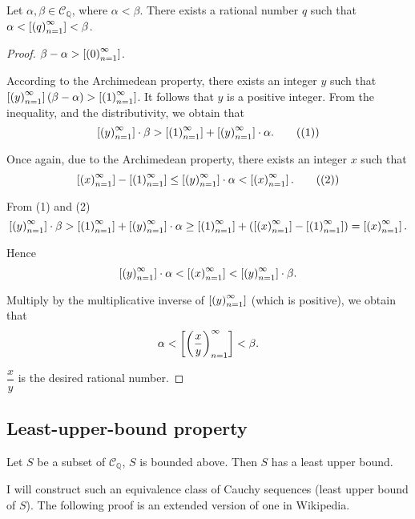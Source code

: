 \begin{theorem}
    Let $\alpha, \beta\in\mathscr{C}_{\mathbb{Q}}$, where $\alpha < \beta$. There exists a rational number $q$ such that $\alpha < \left[{{\left({q}\right)}^{\infty}_{n=1}}\right] < \beta$.
\end{theorem}

\begin{proof}
    $\beta - \alpha > \left[{{\left({0}\right)}^{\infty}_{n=1}}\right]$.

    According to the Archimedean property, there exists an integer $y$ such that $\left[{{\left({y}\right)}^{\infty}_{n=1}}\right](\beta - \alpha) > \left[{{\left({1}\right)}^{\infty}_{n=1}}\right]$. It follows that $y$ is a positive integer. From the inequality, and the distributivity, we obtain that
    \begin{equation*}
        \left[{{\left({y}\right)}^{\infty}_{n=1}}\right]\cdot\beta > \left[{{\left({1}\right)}^{\infty}_{n=1}}\right] + \left[{{\left({y}\right)}^{\infty}_{n=1}}\right]\cdot\alpha.
        \tag{(1)}
    \end{equation*}

    Once again, due to the Archimedean property, there exists an integer $x$ such that
    \begin{equation*}
        \left[{{\left({x}\right)}^{\infty}_{n=1}}\right] - \left[{{\left({1}\right)}^{\infty}_{n=1}}\right] \le \left[{{\left({y}\right)}^{\infty}_{n=1}}\right]\cdot\alpha < \left[{{\left({x}\right)}^{\infty}_{n=1}}\right].
        \tag{(2)}
    \end{equation*}

    From (1) and (2)
    \[
        \left[{{\left({y}\right)}^{\infty}_{n=1}}\right]\cdot\beta > \left[{{\left({1}\right)}^{\infty}_{n=1}}\right] + \left[{{\left({y}\right)}^{\infty}_{n=1}}\right]\cdot\alpha \ge \left[{{\left({1}\right)}^{\infty}_{n=1}}\right] + (\left[{{\left({x}\right)}^{\infty}_{n=1}}\right] - \left[{{\left({1}\right)}^{\infty}_{n=1}}\right]) = \left[{{\left({x}\right)}^{\infty}_{n=1}}\right].
    \]

    Hence
    \[
        \left[{{\left({y}\right)}^{\infty}_{n=1}}\right]\cdot\alpha < \left[{{\left({x}\right)}^{\infty}_{n=1}}\right] < \left[{{\left({y}\right)}^{\infty}_{n=1}}\right]\cdot\beta.
    \]

    Multiply by the multiplicative inverse of $\left[{{\left({y}\right)}^{\infty}_{n=1}}\right]$ (which is positive), we obtain that
    \[
        \alpha < \left[{{\left({\frac{x}{y}}\right)}^{\infty}_{n=1}}\right] < \beta.
    \]

    $\dfrac{x}{y}$ is the desired rational number.
\end{proof}

\subsection{Least-upper-bound property}

\begin{theorem}
    Let $S$ be a subset of $\mathscr{C}_{\mathbb{Q}}$, $S$ is bounded above. Then $S$ has a least upper bound.
\end{theorem}

I will construct such an equivalence class of Cauchy sequences (least upper bound of $S$). The following proof is an extended version of one in Wikipedia.

